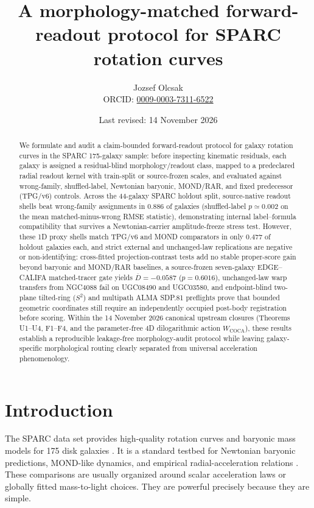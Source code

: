 \documentclass[11pt]{article}
\title{A morphology-matched forward-readout protocol for SPARC rotation curves}
\author{Jozsef Olcsak\\{\small ORCID: \href{https://orcid.org/0009-0003-7311-6522}{0009-0003-7311-6522}}}
\date{Last revised: 14 November 2026}
\begin{document}
\maketitle

\begin{abstract}
We formulate and audit a claim-bounded forward-readout protocol for galaxy
rotation curves in the SPARC 175-galaxy sample: before inspecting kinematic
residuals, each galaxy is assigned a residual-blind morphology/readout class,
mapped to a predeclared radial readout kernel with train-split or source-frozen
scales, and evaluated against wrong-family, shuffled-label, Newtonian baryonic,
MOND/RAR, and fixed predecessor (TPG/v6) controls. Across the 44-galaxy SPARC
holdout split, source-native readout shells beat wrong-family assignments in
\(0.886\) of galaxies (shuffled-label \(p\simeq 0.002\) on the mean
matched-minus-wrong RMSE statistic), demonstrating internal label--formula
compatibility that survives a Newtonian-carrier amplitude-freeze stress test.
However, these 1D proxy shells match TPG/v6 and MOND comparators in only
\(0.477\) of holdout galaxies each, and strict external and unchanged-law
replications are negative or non-identifying: cross-fitted projection-contrast
tests add no stable proper-score gain beyond baryonic and MOND/RAR baselines, a
source-frozen seven-galaxy EDGE--CALIFA matched-tracer gate yields
\(\overline{D}=-0.0587\) (\(p=0.6016\)), unchanged-law warp transfers from
NGC4088 fail on UGC08490 and UGC03580, and endpoint-blind two-plane tilted-ring
(\(S^2\)) and multipath ALMA SDP.81 preflights prove that bounded geometric
coordinates still require an independently occupied post-body registration
before scoring. Within the 14 November 2026 canonical upstream closures
(Theorems U1--U4, F1--F4, and the parameter-free 4D dilogarithmic action
\(W_{\mathrm{COCA}}\)), these results establish a reproducible leakage-free
morphology-audit protocol while leaving galaxy-specific morphological routing
clearly separated from universal acceleration phenomenology.
\end{abstract}

\section{Introduction}

The SPARC data set provides high-quality rotation curves and baryonic mass
models for 175 disk galaxies \cite{Lelli2016SPARC}.  It is a standard testbed
for Newtonian baryonic predictions, MOND-like dynamics, and empirical
radial-acceleration relations \cite{Milgrom1983MOND,McGaugh2016RAR,Li2018RARFits}.
These comparisons are usually organized around scalar acceleration laws or
globally fitted mass-to-light choices.  They are powerful precisely because they
are simple.
\end{document}
